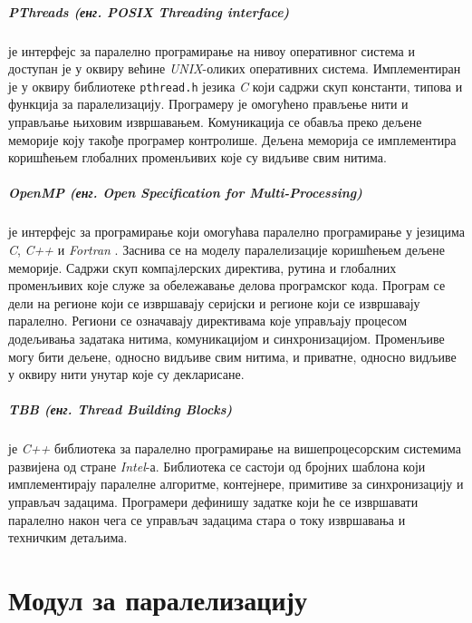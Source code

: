 \documentclass[12pt,oneside]{memoir}
\begin{document}
\paragraph{ PThreads (енг. POSIX Threading interface) \cite{pthread}}је интерфејс за паралелно програмирање на нивоу оперативног система и доступан је у оквиру већине \textit{UNIX}-оликих оперативних система. Имплементиран је у оквиру библиотеке \texttt{pthread.h} језика \textit{C} који садржи скуп константи, типова и функција за паралелизацију. Програмеру је омогућено прављење нити и управљање њиховим извршавањем. Комуникација се обавља преко дељене меморије коју такође програмер контролише. Дељена меморија се имплементира коришћењем глобалних променљивих које су видљиве свим нитима. 

\paragraph{OpenMP (енг. Open Specification for Multi-Processing) \cite{openmp}} је интерфејс за програмирање који омогућава паралелно програмирање у језицима \textit{C}, \textit{C++} и \textit{Fortran} . Заснива се на моделу паралелизације коришћењем дељене меморије. Садржи скуп компаjлерских директива, рутина и глобалних променљивих које служе за обележавање делова програмског кода. Програм се дели на регионе који се извршавају серијски и регионе који се извршавају паралелно. Региони се означавају директивама које управљају процесом додељивања задатака нитима, комуникацијом и синхронизацијом. Променљиве могу бити дељене, односно видљиве свим нитима, и приватне, односно видљиве у оквиру нити унутар које су декларисане.

\paragraph{TBB (енг. Thread Building Blocks) \cite{tbb}} је \textit{C++} библиотека за паралелно програмирање на вишепроцесорским системима развијена од стране \textit{Intel}-а. Библиотека се састоји од бројних шаблона који имплементирају паралелне алгоритме, контејнере, примитиве за синхронизацију и управљач задацима. Програмери дефинишу задатке који ће се извршавати паралелно након чега се управљач задацима стара о току извршавања и техничким детаљима.
  
\chapter{Модул за паралелизацију}
\end{document}
